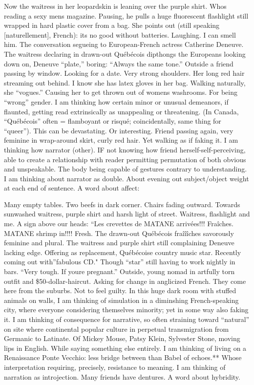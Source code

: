 \documentclass[
]{memoir}
\begin{document}
Now the waitress in her leopardskin is leaning over the purple shirt.
Whos reading a sexy mens magazine. Pausing, he pulls a huge fluorescent
flashlight still wrapped in hard plastic cover from a bag. She points
out (still speaking {[}naturellement{]}, French): its no good without
batteries. Laughing. I can smell him. The conversation segueing to
European-French actress Catherine Deneuve. The waitress declaring in
drawn-out Québécois dipthongs the Europeans looking down on, Deneuve
``plate,'' boring: ``Always the same tone.'' Outside a friend passing by
window. Looking for a date. Very strong shoulders. Her long red hair
streaming out behind. I know she has latex gloves in her bag. Walking
naturally, she ``vogues.'' Causing her to get thrown out of womens
washrooms. For being ``wrong'' gender. I am thinking how certain minor
or unusual demeanors, if flaunted, getting read extrinsically as
unappealing or threatening. (In Canada, ``Québécois'' often = flamboyant
or risqué; coincidentally, same thing for ``queer''). This can be
devastating. Or interesting. Friend passing again, very feminine in
wrap-around skirt, curly red hair. Yet walking as if faking it. I am
thinking how narrator (other). IF not knowing how friend
herself-self-perceiving, able to create a relationship with reader
permitting permutation of both obvious and unspeakable. The body being
capable of gestures contrary to understanding. I am thinking about
narrator as double. About evening out subject/object weight at each end
of sentence. A word about affect:

Many empty tables. Two beefs in dark corner. Chairs fading outward.
Towards sunwashed waitress, purple shirt and harsh light of street.
Waitress, flashlight and me. A sign above our heads: ``Les crevettes de
MATANE arrivées!!! {Fraîches.} MATANE shrimp in!!!! Fresh. The drawn-out
Québécois fraîîîches savorously feminine and plural. The waitress and
purple shirt still complaining Deneuve lacking edge. Offering as
replacement, Québécoise country music star. Recently coming out
with''fabulous CD." Though ``star'' still having to work nightly in
bars. ``Very tough. If youre pregnant.'' Outside, young nomad in
artfully torn outfit and \$50-dollar-haircut. Asking for change in
anglicized French. They come here from the suburbs. Not to feel guilty.
In this huge dark room with stuffed animals on walls, I am thinking of
simulation in a diminshing French-speaking city, where everyone
considering themselves minority; yet in some way also faking it. I am
thinking of consequence for narrative, so often straining toward
``natural'' on site where continental popular culture in perpetual
transmigration from Germanic to Latinate. Of Mickey Mouse, Patsy Klein,
Sylvester Stone, moving lips in English. While saying something else
entirely. I am thinking of living on a Renaissance Ponte Vecchio: less
bridge between than Babel of echoes.** Whose interpretation requiring,
precisely, resistance to meaning. I am thinking of narration as
introjection. Many friends have dentures. A word about hybridity.
\end{document}
